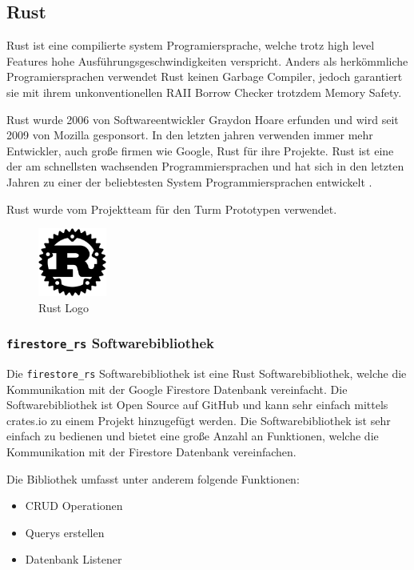 \subsection{Rust}

Rust ist eine compilierte system Programiersprache, welche trotz high level Features hohe Ausführungsgeschwindigkeiten verspricht. Anders als herkömmliche Programiersprachen verwendet Rust keinen Garbage Compiler, jedoch garantiert sie mit ihrem unkonventionellen \ac{RAII} Borrow Checker trotzdem Memory Safety.


Rust wurde 2006 von Softwareentwickler Graydon Hoare erfunden und wird seit 2009 von Mozilla gesponsort\cite{rust_ursprung}. In den letzten jahren verwenden immer mehr Entwickler, auch große firmen wie Google, Rust für ihre Projekte. Rust ist eine der am schnellsten wachsenden Programmiersprachen und hat sich in den letzten Jahren zu einer der beliebtesten System Programmiersprachen entwickelt \cite{stackoverflow_survey}.

Rust wurde vom Projektteam für den Turm Prototypen verwendet.

\begin{figure}[H]
  \centering
  \includegraphics[width=0.20\textwidth]{images/rust_logo.png}
  \caption{Rust Logo}
  \label{fig:rust_logo}
\end{figure}

\subsubsection{\texttt{firestore\_rs} Softwarebibliothek}

Die \texttt{firestore\_rs} Softwarebibliothek ist eine Rust Softwarebibliothek, welche die Kommunikation mit der Google Firestore Datenbank vereinfacht. Die Softwarebibliothek ist Open Source auf GitHub und kann sehr einfach mittels crates.io zu einem Projekt hinzugefügt werden. Die Softwarebibliothek ist sehr einfach zu bedienen und bietet eine große Anzahl an Funktionen, welche die Kommunikation mit der Firestore Datenbank vereinfachen.

Die Bibliothek umfasst unter anderem folgende Funktionen:
\begin{itemize}
  \item \ac{CRUD} Operationen
  \item Querys erstellen
  \item Datenbank Listener
\end{itemize}

